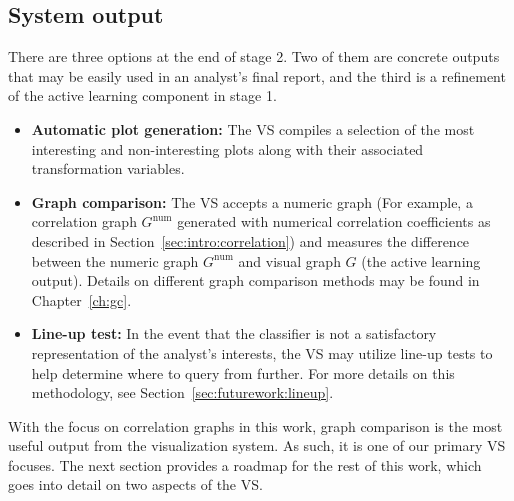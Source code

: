 \subsection{System output}
\label{sec:visualizer:plotgeneration:output}

There are three options at the end of stage 2. Two of them are concrete outputs 
that may be easily used in an analyst's final report, and the third is a 
refinement of the active learning component in stage 1.

\tablespacing
\begin{itemize}
	\item \textbf{Automatic plot generation:} The VS compiles a selection of 
	the most interesting and non-interesting plots along with their 
	associated transformation variables.
	\item \textbf{Graph comparison:} The VS accepts a numeric graph (For 
	example, a correlation graph $G^{\text{num}}$ generated with numerical 
	correlation 
	coefficients as described in Section~\ref{sec:intro:correlation}) and 
	measures the difference between the numeric graph $G^{\text{num}}$ and 
	visual graph $G$ (the active learning output). 
	Details on different graph comparison methods may be found in 
	Chapter~\ref{ch:gc}.
	\item \textbf{Line-up test:} In the event that the classifier is not a 
	satisfactory representation of the analyst's interests, the VS may utilize 
	line-up tests to help determine where to query from further. For more 
	details on this methodology, see Section~\ref{sec:futurework:lineup}.
\end{itemize}
\bodyspacing

With the focus on correlation graphs in this work, graph comparison is the most 
useful output from the visualization system. As such, it is one of our primary 
VS focuses. The next section provides a roadmap for the rest of this work, 
which goes into detail on two aspects of the VS. 